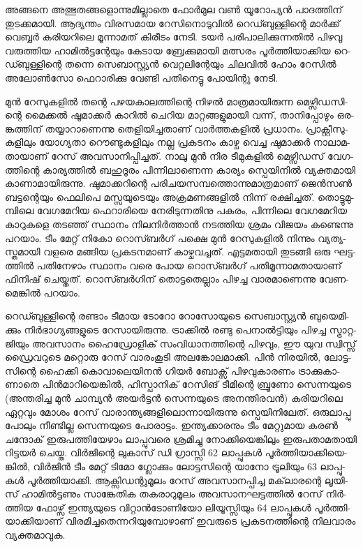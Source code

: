 \vskip 2pt

അ­ങ്ങ­നെ അത്ഭു­ത­ങ്ങ­ളൊ­ന്നു­മി­ല്ലാ­തെ ­ഫോര്‍­മുല വണ്‍ യൂ­റോ­പ്യന്‍ പാ­ദ­ത്തി­ന് തു­ട­ക്ക­മാ­യി. ആദ്യ­ന്തം 
വി­ര­സ­മായ റേ­സി­നൊ­ടു­വില്‍ റെ­ഡ്ബു­ള്ളി­ന്റെ മാര്‍­ക്ക് വെ­ബ്ബര്‍ കരി­യ­റി­ലെ മൂ­ന്നാ­മ­ത് കി­രീ­ടം നേ­ടി. 
ടയര്‍ പരി­പാ­ലി­ക്കു­ന്ന­തില്‍ പി­ഴ­വു വരു­ത്തിയ ഹാ­മില്‍­ട്ട­ന്റേ­യും കേ­ടായ ബ്രേ­ക്കു­മാ­യി മത്സ­രം 
പൂര്‍­ത്തി­യാ­ക്കിയ റെ­ഡ്ബു­ള്ളി­ന്റെ തന്നെ സെ­ബാ­സ്റ്റ്യന്‍ വെ­റ്റ­ലി­ന്റേ­യും ചി­ല­വില്‍ ഹോം റേ­സില്‍ 
അലോണ്‍­സോ ഫെ­റാ­രി­ക്കു വേ­ണ്ടി പതി­നെ­ട്ടു പോ­യി­ന്റു നേ­ടി­.

­മുന്‍ റേ­സു­ക­ളില്‍ തന്റെ പഴ­യ­കാ­ല­ത്തി­ന്റെ നി­ഴല്‍ മാ­ത്ര­മാ­യി­രു­ന്ന മെ­ഴ്സി­ഡ­സി­ന്റെ മൈ­ക്കല്‍ ­ഷൂ­മാ­ക്കര്‍ 
കാ­റില്‍ ചെ­റിയ മാ­റ്റ­ങ്ങ­ളു­മാ­യി വന്ന്, താ­നി­പ്പോ­ഴും ഒര­ങ്ക­ത്തി­ന് തയ്യാ­റാ­ണെ­ന്നു തെ­ളി­യി­ച്ച­താ­ണ് 
വാര്‍­ത്ത­ക­ളില്‍ പ്ര­ധാ­നം. പ്രാ­ക്റ്റീ­സു­ക­ളി­ലും യോ­ഗ്യ­താ റൌ­ണ്ടു­ക­ളി­ലും നല്ല പ്ര­ക­ട­നം കാ­ഴ്ച വെ­ച്ച ഷു­മാ­ക്കര്‍ 
നാ­ലാ­മ­താ­യാ­ണ് റേ­സ് അവ­സാ­നി­പ്പി­ച്ച­ത്. നാ­ലു മുന്‍ നിര ടീ­മു­ക­ളില്‍ മെ­ഴ്സി­ഡ­സ് വേ­ഗ­ത്തി­ന്റെ കാ­ര്യ­ത്തില്‍ 
ബഹു­ദൂ­രം പി­ന്നി­ലാ­ണെ­ന്ന കാ­ര്യം സ്പെ­യി­നില്‍ വ്യ­ക്ത­മാ­യി കാ­ണാ­മാ­യി­രു­ന്നു. ഷു­മാ­ക്ക­റി­ന്റെ 
പരി­ച­യ­സ­മ്പ­ത്തൊ­ന്നു­മാ­ത്ര­മാ­ണ് ജെന്‍­സണ്‍ ബട്ട­ന്റെ­യും ഫെ­ലി­പെ മസ്സ­യു­ടെ­യും അക്ര­മ­ണ­ങ്ങ­ളില്‍ നി­ന്ന് 
രക്ഷി­ച്ച­ത്. തൊ­ട്ടു­മു­മ്പി­ലെ വേ­ഗ­മേ­റിയ ഫെ­റാ­രി­യെ നേ­രി­ടു­ന്ന­തി­നു പക­രം, പി­ന്നി­ലെ വേ­ഗ­മേ­റിയ കാ­റു­ക­ളെ 
തട­ഞ്ഞ് സ്ഥാ­നം നി­ല­നിര്‍­ത്താന്‍ നട­ത്തിയ ശ്ര­മം വി­ജ­യം കണ്ടെ­ന്നു പറ­യാം. ടീം മേ­റ്റ് നി­കോ റൊ­സ്ബര്‍­ഗ് 
പക്ഷെ മുന്‍ റേ­സു­ക­ളില്‍ നി­ന്നും വ്യ­ത്യ­സ്ത­മാ­യി വള­രെ മങ്ങിയ പ്ര­ക­ട­ന­മാ­ണ് കാ­ഴ്ച­വ­ച്ച­ത്. എട്ട­മ­താ­യി തു­ട­ങ്ങി 
ഒരു ഘട്ട­ത്തില്‍ പതി­നേ­ഴാം സ്ഥാ­നം വരെ പോയ റൊ­സ്ബര്‍­ഗ് പതി­മൂ­ന്നാ­മ­താ­യാ­ണ് ഫി­നി­ഷ് ചെ­യ്ത­ത്. 
റൊ­സ്ബര്‍­ഗി­ന് തൊ­ട്ട­തെ­ല്ലാം പി­ഴ­ച്ച വാ­ര­മാ­ണെ­ന്നു വേ­ണ­മെ­ങ്കില്‍ പറ­യാം.

­റെ­ഡ്ബു­ള്ളി­ന്റെ രണ്ടാം ടീ­മായ ടോ­റോ റോ­സോ­യു­ടെ സെ­ബാ­സ്റ്റ്യന്‍ ബു­യെ­മി­ക്കും നിര്‍­ഭാ­ഗ്യ­ങ്ങ­ളു­ടെ റേ­സാ­യി­രു­ന്നു. 
ട്രാ­ക്കില്‍ രണ്ടു പെ­നാല്‍­ട്ടി­യും പി­ഴ­ച്ച സ്ട്രാ­റ്റ­ജി­യും അവ­സാ­നം ഹൈ­ഡ്രോ­ളി­ക് സം­വി­ധാ­ന­ത്തി­ന്റെ പി­ഴ­വും, ഈ യുവ 
സ്വി­സ്സ് ഡ്രൈ­വ­റു­ടെ മറ്റൊ­രു റേ­സ് വാ­രം­കൂ­ടി അല­ങ്കോ­ല­മാ­ക്കി. പിന്‍ നി­ര­യില്‍, ലോ­ട്ട­സി­ന്റെ ഹൈ­ക്കി 
കൊ­വാ­ലെ­യി­നന്‍ ഗി­യര്‍ ബോ­ക്സ് പി­ഴ­വു­കാ­ര­ണം ട്രാ­ക്കു­കാ­ണാ­തെ പിന്‍­മാ­റി­യെ­ങ്കില്‍, ഹി­സ്പാ­നി­ക് റേ­സി­ങ് ടീ­മി­ന്റെ 
ബ്രൂ­ണോ സെ­ന്നയു­ടെ (അ­ന്ത­രി­ച്ച മുന്‍ ചാ­മ്പ്യന്‍ അയര്‍­ട്ടന്‍ സെ­ന്ന­യു­ടെ അന­ന്തി­ര­വന്‍)­ കരി­യ­റി­ലെ ഏറ്റ­വും മോ­ശം 
റേ­സ് വാ­രാ­ന്ത്യ­ങ്ങ­ളി­ലൊ­ന്നാ­യി­രു­ന്നു സ്പെ­യി­നി­ലേ­ത്. ഒരു­ലാ­പ്പു പോ­ലും നീ­ണ്ടി­ല്ല സെ­ന്ന­യു­ടെ പോ­രാ­ട്ടം. ഇന്ത്യ­ക്കാ­ര­നും 
ടീം മേ­റ്റു­മായ കരണ്‍ ചന്ദോ­ക് ഇരു­പ­ത്തി­യേ­ഴാം ലാ­പ്പു­വ­രെ ​ശ്ര­മി­ച്ചു നോ­ക്കി­യെ­ങ്കി­ലും ഇരു­പ­താ­മ­താ­യി റി­ട്ട­യര്‍ ചെ­യ്ത. 
വിര്‍­ജി­ന്റെ ലു­കാ­സ് ഡി ഗ്രാ­സ്സി 62 ലാ­പ്പു­കള്‍ പൂര്‍­ത്തി­യാ­ക്കി­യെ­ങ്കില്‍, വിര്‍­ജിന്‍ ടീം മേ­റ്റ് ടി­മോ ഗ്ലോ­ക്കും ലോ­ട്ട­സി­ന്റെ 
യാ­നോ ട്രൂ­ലി­യും 63 ലാ­പ്പു­കള്‍ പൂര്‍­ത്തി­യാ­ക്കി. ആക്സി­ഡ­ന്റു­മൂ­ലം റേ­സ് അവ­സാ­ന­പ്പി­ച്ച മക്‌­ലാ­ര­ന്റെ ലൂ­യി­സ് 
ഹാ­മില്‍­ട്ട­ണും സാ­ങ്കേ­തിക തക­രാ­റു­മൂ­ലം അവ­സാ­ന­ഘ­ട്ട­ത്തില്‍ റേ­സ് നിര്‍­ത്തിയ ഫോ­ഴ്സ് ഇന്ത്യ­യു­ടെ വി­റ്റാന്‍­ടോ­ണി­യോ 
ലി­യൂ­സ്സി­യും 64 ലാ­പ്പു­കള്‍ പൂര്‍­ത്തി­യാ­ക്കി­യാ­ണ് വി­ര­മി­ച്ച­തെ­ന്ന­റി­യു­മ്പോ­ഴാ­ണ് ഇവ­രു­ടെ പ്ര­ക­ട­ന­ത്തി­ന്റെ നി­ല­വാ­രം 
വ്യ­ക്ത­മാ­വു­ക.

